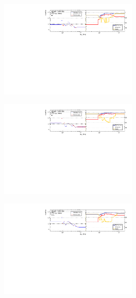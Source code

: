 \begin{figure}[htb]
    \centering 
    \begin{subfigure}{.99\textwidth}\centering
        \includegraphics[width = 0.75\textwidth]{Figures/m4l/UnfoldingStudies/v014_inputs/m4l_event_type0-1inputs.pdf}
    \end{subfigure}
    \begin{subfigure}{.99\textwidth}\centering
        \includegraphics[width = 0.75\textwidth]{Figures/m4l/UnfoldingStudies/v014_inputs/m4l_event_type0-0inputs.pdf}
    \end{subfigure}
    \begin{subfigure}{.99\textwidth}\centering
        \includegraphics[width = 0.75\textwidth]{Figures/m4l/UnfoldingStudies/v014_inputs/m4l_event_type1-3inputs.pdf}

\end{subfigure}
\end{figure}
